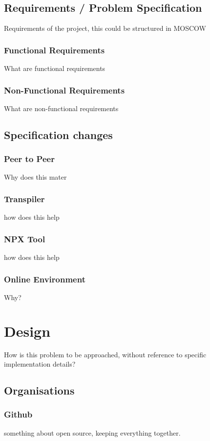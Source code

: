 \documentclass{l4proj}
\begin{document}
\section{Requirements / Problem Specification}
\text Requirements of the project, this could be structured in MOSCOW
\subsection{Functional Requirements}
\text What are functional requirements
\subsection{Non-Functional Requirements}
\text What are non-functional requirements

\section{Specification changes}
\subsection{Peer to Peer}
\text Why does this mater

\subsection{Transpiler}
\text how does this help

\subsection{NPX Tool}
\text how does this help

\subsection{Online Environment}
\text Why?
\chapter{Design}
How is this problem to be approached, without reference to specific implementation details? 
\section{Organisations}
\subsection{Github}
\text something about open source, keeping everything together.
\end{document}
